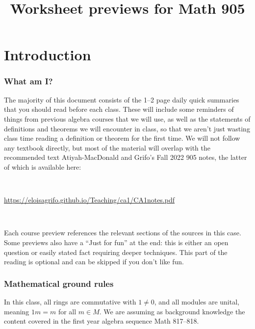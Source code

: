 \documentclass[12pt]{amsart}
\newcommand{\0}{$\phantom{.}$}
\newcommand{\1}{\mathbbm{1}}
\newcommand{\showsol}[1]{\def\displaysol{#1}}
\begin{document}
\showsol{0}


\title{Worksheet previews for Math 905}\maketitle
\thispagestyle{empty}
\pagestyle{plain}

\tableofcontents

\newpage


\setcounter{section}{0}
\section*{Introduction}

\subsubsection*{What am I?\nopunct} The majority of this document consists of the 1--2 page daily quick summaries that you should read before each class. These will include some reminders of things from previous algebra courses that we will use, as well as the statements of definitions and theorems we will encounter in class, so that we aren't just wasting class time reading a definition or theorem for the first time. We will not follow any textbook directly, but most of the material will overlap with the recommended text Atiyah-MacDonald and Grifo's Fall 2022 905 notes, the latter of which is available here:

\

\url{https://eloisagrifo.github.io/Teaching/ca1/CA1notes.pdf}

\

\noindent Each course preview references the relevant sections of the sources in this case. Some previews also have a ``Just for fun'' at the end: this is either an open question or easily stated fact requiring deeper techniques. This part of the reading is optional and can be skipped if you don't like fun.

\subsubsection*{Mathematical ground rules} In this class, all rings are commutative with $1\neq 0$, and all modules are unital, meaning $1m=m$ for all $m\in M$. We are assuming as background knowledge the content covered in the first year algebra sequence Math 817--818.
\end{document}
